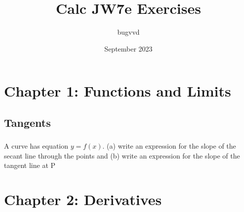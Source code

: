 \documentclass[12pt, letterpaper]{article}
\title{Calc JW7e Exercises}
\author{bugvvd}
\date{September 2023}
\begin{document}
\maketitle
\section{Chapter 1: Functions and Limits}
\subsection{Tangents}
\subsubsection{}
A curve has equation $y=f(x)$. (a) write an expression for the slope of the secant line
through the points and (b) write an expression for the slope of the tangent line at P
\subsubsection{}
\subsubsection{}
\subsubsection{}
\subsubsection{}
\section{Chapter 2: Derivatives}
\end{document}
